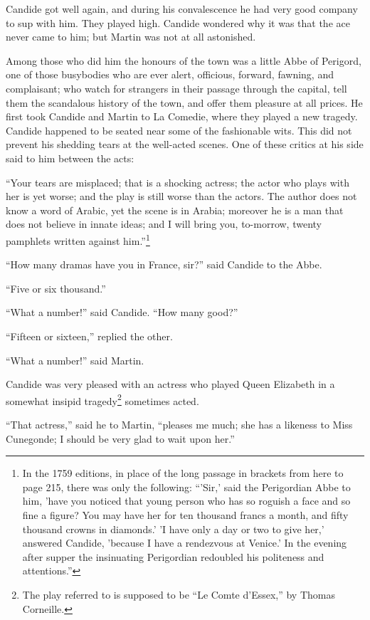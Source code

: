 Candide got well again, and during his convalescence he had very good company to sup with him. They played high. Candide wondered why it was that the ace never came to him; but Martin was not at all astonished.

Among those who did him the honours of the town was a little Abbe of Perigord, one of those busybodies who are ever alert, officious, forward, fawning, and complaisant; who watch for strangers in their passage through the capital, tell them the scandalous history of the town, and offer them pleasure at all prices. He first took Candide and Martin to La Comedie, where they played a new tragedy. Candide happened to be seated near some of the fashionable wits. This did not prevent his shedding tears at the well-acted scenes. One of these critics at his side said to him between the acts:

``Your tears are misplaced; that is a shocking actress; the actor who plays with her is yet worse; and the play is still worse than the actors. The author does not know a word of Arabic, yet the scene is in Arabia; moreover he is a man that does not believe in innate ideas; and I will bring you, to-morrow, twenty pamphlets written against him.''\footnote{In the 1759 editions, in place of the long passage in brackets from here to page 215, there was only the following: ``'Sir,' said the Perigordian Abbe to him, 'have you noticed that young person who has so roguish a face and so fine a figure? You may have her for ten thousand francs a month, and fifty thousand crowns in diamonds.' 'I have only a day or two to give her,' answered Candide, 'because I have a rendezvous at Venice.' In the evening after supper the insinuating Perigordian redoubled his politeness and attentions.''}

``How many dramas have you in France, sir?'' said Candide to the Abbe.

``Five or six thousand.''

``What a number!'' said Candide. ``How many good?''

``Fifteen or sixteen,'' replied the other.

``What a number!'' said Martin.

Candide was very pleased with an actress who played Queen Elizabeth in a somewhat insipid tragedy\footnote{The play referred to is supposed to be ``Le Comte d'Essex,'' by Thomas Corneille.} sometimes acted.

``That actress,'' said he to Martin, ``pleases me much; she has a likeness to Miss Cunegonde; I should be very glad to wait upon her.''

